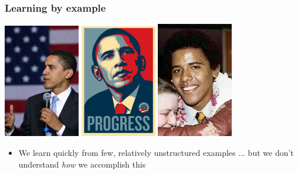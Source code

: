 \documentclass[xcolor=dvipsnames, 9pt]{beamer}
\begin{document}
\begin{frame}
  \frametitle{Learning by example}%

    \begin{center}
      \includegraphics[width=0.25\textwidth]{obama1.png}
      \includegraphics[width=0.25\textwidth]{obama2.png}
      \includegraphics[width=0.25\textwidth]{obama4.png}
    \end{center}

    \begin{itemize}
      \item We learn quickly from few, relatively unstructured examples
       ... but we don't understand {\it how} we accomplish this
    \end{itemize}

\end{frame}
\end{document}
